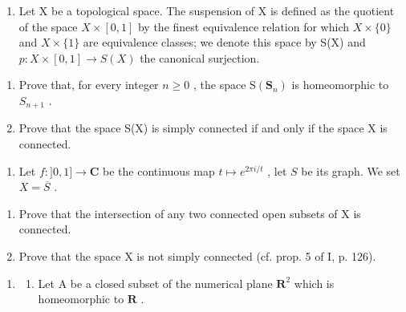 \exercisegroup

\begin{enumerate}
\def\labelenumi{\arabic{enumi})}
\tightlist
\item
  Let X be a topological space. The suspension of X is defined as the quotient of the space \(X \times [0,1]\) by the finest equivalence relation for which \(X \times \{0\}\) and \(X \times \{1\}\) are equivalence classes; we denote this space by S(X) and \(p: X \times [0,1] \to S(X)\) the canonical surjection.
\end{enumerate}

\begin{enumerate}
\def\labelenumi{\alph{enumi})}
\item
  Prove that, for every integer \(n \geqslant 0\) , the space \(\mathrm{S}(\mathbf{S}_{n})\) is homeomorphic to \(S_{n+1}\) .
\item
  Prove that the space S(X) is simply connected if and only if the space X is connected.
\end{enumerate}

\begin{enumerate}
\def\labelenumi{\arabic{enumi})}
\setcounter{enumi}{1}
\tightlist
\item
  Let \(f: ]0,1] \to \mathbf{C}\) be the continuous map \(t \mapsto e^{2\pi i / t}\) , let \(S\) be its graph. We set \(X = \overline{S}\) .
\end{enumerate}

\begin{enumerate}
\def\labelenumi{\alph{enumi})}
\item
  Prove that the intersection of any two connected open subsets of X is connected.
\item
  Prove that the space X is not simply connected (cf. prop. 5 of I, p. 126).
\end{enumerate}

\begin{enumerate}
\def\labelenumi{\arabic{enumi})}
\setcounter{enumi}{2}
\tightlist
\item
  \begin{enumerate}
  \def\labelenumii{(\arabic{enumii})}
  \setcounter{enumii}{2}
  \tightlist
  \item
    Let A be a closed subset of the numerical plane \(\mathbf{R}^2\) which is homeomorphic to \(\mathbf{R}\) .
  \end{enumerate}
\end{enumerate}

